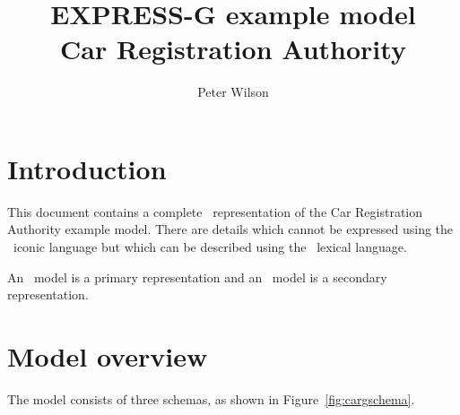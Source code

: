 \documentclass{article}
\title{EXPRESS-G example model \\ Car Registration Authority}
\author{Peter Wilson}
\date{}
\begin{document}
\maketitle

\tableofcontents
\listoffigures
\clearpage


\makeatletter \@topnum\z@ \makeatother
\section{Introduction}

This document contains a complete \ExpressG\ representation of the
Car Registration Authority example model. There are details which cannot
be expressed using the \ExpressG\ iconic language but which can be described
using the \Express\ lexical language.

    An \Express\ model is a primary representation and an \ExpressG\ model
is a secondary representation.

\section{Model overview}

The model consists of three schemas, as shown in Figure~\ref{fig:cargschema}.
\end{document}
